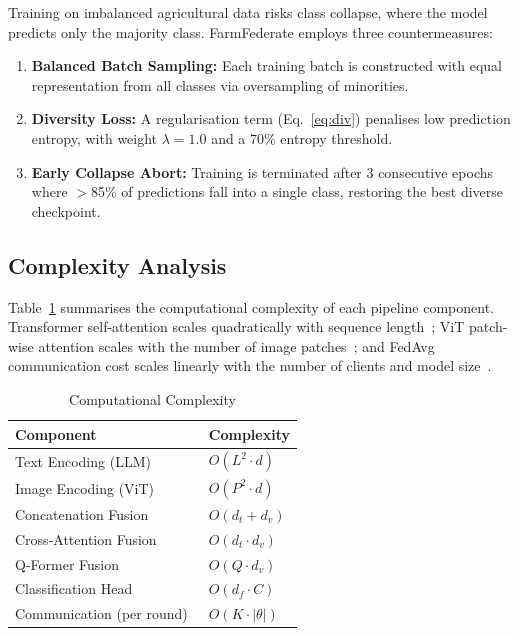 \documentclass[conference]{IEEEtran}
\begin{document}
Training on imbalanced agricultural data risks class collapse, where the model predicts
only the majority class. FarmFederate employs three countermeasures:
\begin{enumerate}
  \item \textbf{Balanced Batch Sampling:} Each training batch is constructed with equal
        representation from all classes via oversampling of minorities.
  \item \textbf{Diversity Loss:} A regularisation term (Eq.~\ref{eq:div}) penalises
        low prediction entropy, with weight $\lambda=1.0$ and a 70\% entropy threshold.
  \item \textbf{Early Collapse Abort:} Training is terminated after 3 consecutive epochs
        where $>$85\% of predictions fall into a single class, restoring the best diverse
        checkpoint.
\end{enumerate}

\subsection{Complexity Analysis}

Table~\ref{tab:complexity} summarises the computational complexity of each pipeline
component. Transformer self-attention scales quadratically with sequence length~\cite{Vaswani2017};
ViT patch-wise attention scales with the number of image patches~\cite{Dosovitskiy2021};
and FedAvg communication cost scales linearly with the number of clients and model
size~\cite{McMahan2017}.

\begin{table}[t]
\caption{Computational Complexity}
\label{tab:complexity}
\centering\footnotesize
\begin{tabular}{ll}
\toprule
\textbf{Component} & \textbf{Complexity}\\
\midrule
Text Encoding (LLM)~\cite{Vaswani2017}   & $O(L^2 \cdot d)$ \\
Image Encoding (ViT)~\cite{Dosovitskiy2021} & $O(P^2 \cdot d)$ \\
Concatenation Fusion         & $O(d_t + d_v)$ \\
Cross-Attention Fusion~\cite{Vaswani2017} & $O(d_t \cdot d_v)$ \\
Q-Former Fusion~\cite{Li2023}              & $O(Q \cdot d_v)$ \\
Classification Head          & $O(d_f \cdot C)$ \\
Communication (per round)~\cite{McMahan2017} & $O(K \cdot |\theta|)$ \\
\bottomrule
\end{tabular}
\end{table}
\end{document}
